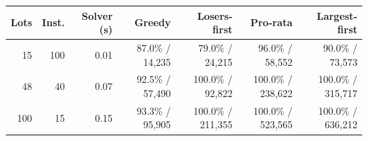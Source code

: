 \begin{tabular}{rrrrrrr}
\hline
Lots & Inst. & Solver (s) & Greedy & Losers-first & Pro-rata & Largest-first \\
\hline
15 & 100 & 0.01 & 87.0\% / 14,235 & 79.0\% / 24,215 & 96.0\% / 58,552 & 90.0\% / 73,573 \\
48 & 40 & 0.07 & 92.5\% / 57,490 & 100.0\% / 92,822 & 100.0\% / 238,622 & 100.0\% / 315,717 \\
100 & 15 & 0.15 & 93.3\% / 95,905 & 100.0\% / 211,355 & 100.0\% / 523,565 & 100.0\% / 636,212 \\
\hline
\end{tabular}
